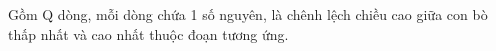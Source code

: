 Gồm Q dòng, mỗi dòng chứa 1 số nguyên, là chênh lệch chiều cao giữa con bò thấp nhất và cao nhất thuộc đoạn tương ứng.